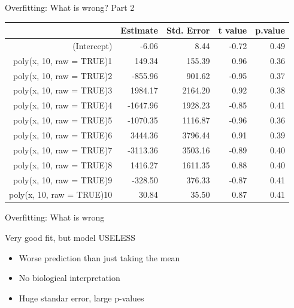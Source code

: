 \documentclass[10pt]{beamer}\usepackage[]{graphicx}\usepackage[]{color}
\begin{document}
\begin{frame}{Overfitting: What is wrong? Part 2}

\begin{table}[ht]
\centering
\begin{tabular}{rrrrr}
  \hline
 & Estimate & Std. Error & t value & p.value \\ 
  \hline
(Intercept) & -6.06 & 8.44 & -0.72 & 0.49 \\ 
  poly(x, 10, raw = TRUE)1 & 149.34 & 155.39 & 0.96 & 0.36 \\ 
  poly(x, 10, raw = TRUE)2 & -855.96 & 901.62 & -0.95 & 0.37 \\ 
  poly(x, 10, raw = TRUE)3 & 1984.17 & 2164.20 & 0.92 & 0.38 \\ 
  poly(x, 10, raw = TRUE)4 & -1647.96 & 1928.23 & -0.85 & 0.41 \\ 
  poly(x, 10, raw = TRUE)5 & -1070.35 & 1116.87 & -0.96 & 0.36 \\ 
  poly(x, 10, raw = TRUE)6 & 3444.36 & 3796.44 & 0.91 & 0.39 \\ 
  poly(x, 10, raw = TRUE)7 & -3113.36 & 3503.16 & -0.89 & 0.40 \\ 
  poly(x, 10, raw = TRUE)8 & 1416.27 & 1611.35 & 0.88 & 0.40 \\ 
  poly(x, 10, raw = TRUE)9 & -328.50 & 376.33 & -0.87 & 0.41 \\ 
  poly(x, 10, raw = TRUE)10 & 30.84 & 35.50 & 0.87 & 0.41 \\ 
   \hline
\end{tabular}
\end{table}


\end{frame}

\begin{frame}{Overfitting: What is wrong}

\begin{alertblock}{Very good fit, but model USELESS}
\begin{itemize}
  \item Worse prediction than just taking the mean
  \item No biological interpretation
  \item Huge standar error, large p-values
\end{itemize}
\end{alertblock}

\end{frame}
\end{document}
